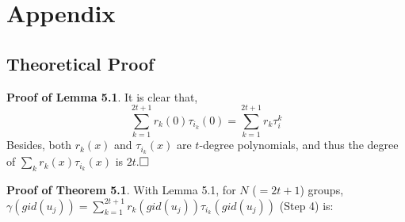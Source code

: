 \section{Appendix}

\subsection{Theoretical Proof}

%

\textbf{Proof of Lemma 5.1}. It is clear that,
\begin{equation}
	\sum_{k=1}^{2t+1} r_k(0)\tau_{i_k}(0) = \sum_{k=1}^{2t+1} r_k\tau_i^k
\end{equation}
Besides, both $r_k(x)$ and $\tau_{i_k}(x)$ are $t$-degree polynomials, and thus the degree of $\sum_k r_k(x)\tau_{i_k}(x)$ is $2t$.$\qed$

\vspace{+.5em}

\noindent \textbf{Proof of Theorem 5.1}. With Lemma 5.1, for $N$ ($=2t+1$) groups, $\gamma(gid(u_j))
=\sum_{k=1}^{2t+1} r_k(gid(u_j)) \tau_{i_k}(gid(u_j))$ (Step 4) is:

